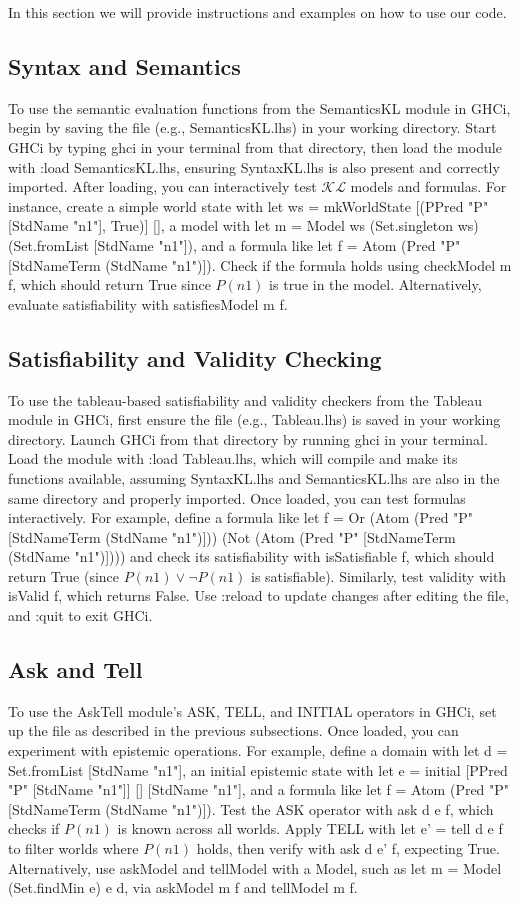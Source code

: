 \documentclass[12pt,a4paper]{article}
\begin{document}
In this section we will provide instructions and examples on how to use our code.

\subsection{Syntax and Semantics}
To use the semantic evaluation functions from the SemanticsKL module in GHCi, begin by saving the file (e.g., SemanticsKL.lhs) in your working directory. Start GHCi by typing ghci in your terminal from that directory, then load the module with :load SemanticsKL.lhs, ensuring SyntaxKL.lhs is also present and correctly imported. After loading, you can interactively test $\mathcal{KL}$ models and formulas. 
For instance, create a simple world state with let ws = mkWorldState [(PPred "P" [StdName "n1"], True)] [], a model with let m = Model ws (Set.singleton ws) (Set.fromList [StdName "n1"]), and a formula like let f = Atom (Pred "P" [StdNameTerm (StdName "n1")]). Check if the formula holds using checkModel m f, which should return True since $P(n1)$ is true in the model. Alternatively, evaluate satisfiability with satisfiesModel m f.

\subsection{Satisfiability and Validity Checking}
To use the tableau-based satisfiability and validity checkers from the Tableau module in GHCi, first ensure the file (e.g., Tableau.lhs) is saved in your working directory. Launch GHCi from that directory by running ghci in your terminal. Load the module with :load Tableau.lhs, which will compile and make its functions available, assuming SyntaxKL.lhs and SemanticsKL.lhs are also in the same directory and properly imported. Once loaded, you can test formulas interactively. For example, define a formula like let f = Or (Atom (Pred "P" [StdNameTerm (StdName "n1")])) (Not (Atom (Pred "P" [StdNameTerm (StdName "n1")]))) and check its satisfiability with isSatisfiable f, which should return True (since $P(n1)\lor \neg P(n1)$ is satisfiable). Similarly, test validity with isValid f, which returns False. Use :reload to update changes after editing the file, and :quit to exit GHCi.

\subsection{Ask and Tell}
To use the AskTell module's ASK, TELL, and INITIAL operators in GHCi, set up the file as described in the previous subsections. 
Once loaded, you can experiment with epistemic operations. For example, define a domain with let d = Set.fromList [StdName "n1"], an initial epistemic state with let e = initial [PPred "P" [StdName "n1"]] [] [StdName "n1"], and a formula like let f = Atom (Pred "P" [StdNameTerm (StdName "n1")]). Test the ASK operator with ask d e f, which checks if $P(n1)$ is known across all worlds.
Apply TELL with let e' = tell d e f to filter worlds where $P(n1)$ holds, then verify with ask d e' f, expecting True. Alternatively, use askModel and tellModel with a Model, such as let m = Model (Set.findMin e) e d, via askModel m f and tellModel m f.
\end{document}
